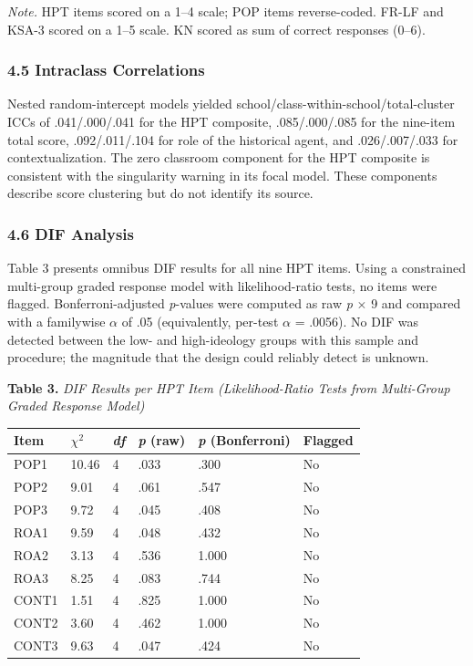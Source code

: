 \documentclass[
  12pt,
]{article}
\begin{document}
\emph{Note.} HPT items scored on a 1--4 scale; POP items reverse-coded. FR-LF and KSA-3 scored on a 1--5 scale. KN scored as sum of correct responses (0--6).

\hypertarget{intraclass-correlations}{%
\subsubsection{4.5 Intraclass Correlations}\label{intraclass-correlations}}

Nested random-intercept models yielded school/class-within-school/total-cluster
ICCs of .041/.000/.041 for the HPT composite,
.085/.000/.085 for the nine-item total score, .092/.011/.104 for role of the
historical agent, and .026/.007/.033 for contextualization. The zero classroom
component for the HPT composite is consistent with the singularity warning
in its focal model. These components describe score clustering but do not
identify its source.

\hypertarget{dif-analysis}{%
\subsubsection{4.6 DIF Analysis}\label{dif-analysis}}

Table 3 presents omnibus DIF results for all nine HPT items. Using a constrained multi-group graded response model with likelihood-ratio
tests, no items were flagged. Bonferroni-adjusted \emph{p}-values were computed
as raw \emph{p} \(\times\) 9 and compared with a familywise \(\alpha\) of .05
(equivalently, per-test \(\alpha\) = .0056). No DIF was detected between the low- and high-ideology groups with this sample and procedure; the magnitude that the design could reliably detect is unknown.

\textbf{Table 3.} \emph{DIF Results per HPT Item (Likelihood-Ratio Tests from Multi-Group Graded Response Model)}

\begin{longtable}[]{@{}llllll@{}}
\toprule
Item & \(\chi^2\) & \emph{df} & \emph{p} (raw) & \emph{p} (Bonferroni) & Flagged \\
\midrule
\endhead
\bottomrule
\endlastfoot
POP1 & 10.46 & 4 & .033 & .300 & No \\
POP2 & 9.01 & 4 & .061 & .547 & No \\
POP3 & 9.72 & 4 & .045 & .408 & No \\
ROA1 & 9.59 & 4 & .048 & .432 & No \\
ROA2 & 3.13 & 4 & .536 & 1.000 & No \\
ROA3 & 8.25 & 4 & .083 & .744 & No \\
CONT1 & 1.51 & 4 & .825 & 1.000 & No \\
CONT2 & 3.60 & 4 & .462 & 1.000 & No \\
CONT3 & 9.63 & 4 & .047 & .424 & No \\
\end{longtable}
\end{document}
